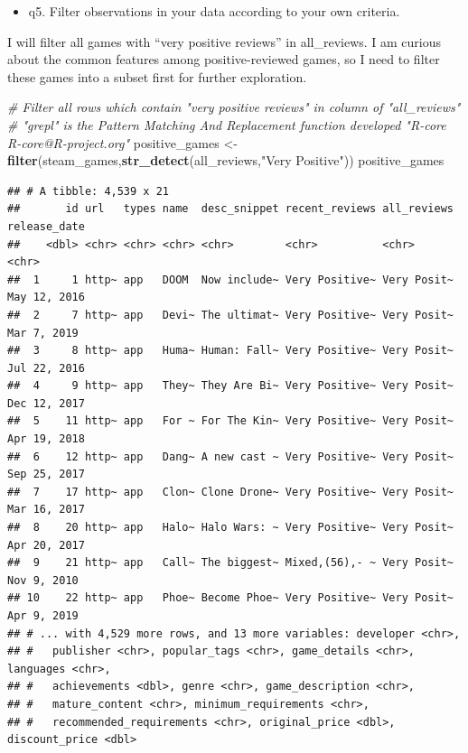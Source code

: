 \documentclass[
]{article}
\newenvironment{Shaded}{\begin{snugshade}}{\end{snugshade}}
\newcommand{\CommentTok}[1]{\textcolor[rgb]{0.56,0.35,0.01}{\textit{#1}}}
\newcommand{\KeywordTok}[1]{\textcolor[rgb]{0.13,0.29,0.53}{\textbf{#1}}}
\newcommand{\NormalTok}[1]{#1}
\newcommand{\StringTok}[1]{\textcolor[rgb]{0.31,0.60,0.02}{#1}}
\providecommand{\tightlist}{%
  \setlength{\itemsep}{0pt}\setlength{\parskip}{0pt}}
\begin{document}
\begin{itemize}
\tightlist
\item
  q5. Filter observations in your data according to your own criteria.
\end{itemize}

I will filter all games with ``very positive reviews'' in all\_reviews.
I am curious about the common features among positive-reviewed games, so
I need to filter these games into a subset first for further
exploration.

\begin{Shaded}
\begin{Highlighting}[]
\CommentTok{\# Filter all rows which contain "very positive reviews" in column of "all\_reviews"}
\CommentTok{\# "grepl" is the Pattern Matching And Replacement function developed  "R{-}core R{-}core@R{-}project.org"}
\NormalTok{positive\_games \textless{}{-}}\StringTok{ }\KeywordTok{filter}\NormalTok{(steam\_games,}\KeywordTok{str\_detect}\NormalTok{(all\_reviews,}\StringTok{"Very Positive"}\NormalTok{))}
\NormalTok{positive\_games}
\end{Highlighting}
\end{Shaded}

\begin{verbatim}
## # A tibble: 4,539 x 21
##       id url   types name  desc_snippet recent_reviews all_reviews release_date
##    <dbl> <chr> <chr> <chr> <chr>        <chr>          <chr>       <chr>       
##  1     1 http~ app   DOOM  Now include~ Very Positive~ Very Posit~ May 12, 2016
##  2     7 http~ app   Devi~ The ultimat~ Very Positive~ Very Posit~ Mar 7, 2019 
##  3     8 http~ app   Huma~ Human: Fall~ Very Positive~ Very Posit~ Jul 22, 2016
##  4     9 http~ app   They~ They Are Bi~ Very Positive~ Very Posit~ Dec 12, 2017
##  5    11 http~ app   For ~ For The Kin~ Very Positive~ Very Posit~ Apr 19, 2018
##  6    12 http~ app   Dang~ A new cast ~ Very Positive~ Very Posit~ Sep 25, 2017
##  7    17 http~ app   Clon~ Clone Drone~ Very Positive~ Very Posit~ Mar 16, 2017
##  8    20 http~ app   Halo~ Halo Wars: ~ Very Positive~ Very Posit~ Apr 20, 2017
##  9    21 http~ app   Call~ The biggest~ Mixed,(56),- ~ Very Posit~ Nov 9, 2010 
## 10    22 http~ app   Phoe~ Become Phoe~ Very Positive~ Very Posit~ Apr 9, 2019 
## # ... with 4,529 more rows, and 13 more variables: developer <chr>,
## #   publisher <chr>, popular_tags <chr>, game_details <chr>, languages <chr>,
## #   achievements <dbl>, genre <chr>, game_description <chr>,
## #   mature_content <chr>, minimum_requirements <chr>,
## #   recommended_requirements <chr>, original_price <dbl>, discount_price <dbl>
\end{verbatim}
\end{document}
